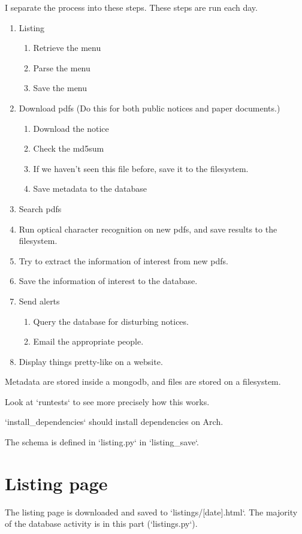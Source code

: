 I separate the process into these steps. These steps are run each day.

\begin{enumerate}
\item Listing
  \begin{enumerate}
  \item Retrieve the menu
  \item Parse the menu
  \item Save the menu
  \end{enumerate}
\item Download pdfs (Do this for both public notices and paper documents.)
  \begin{enumerate}
  \item Download the notice
  \item Check the md5sum
  \item If we haven't seen this file before, save it to the filesystem.
  \item Save metadata to the database
  \end{enumerate}
\item Search pdfs
  \item Run optical character recognition on new pdfs, and save results to the filesystem.
  \item Try to extract the information of interest from new pdfs.
  \item Save the information of interest to the database.
\item Send alerts
  \begin{enumerate}
  \item Query the database for disturbing notices.
  \item Email the appropriate people.
  \end{enumerate}
\item Display things pretty-like on a website.
\end{enumerate}

Metadata are stored inside a mongodb, and files are stored on a filesystem.

Look at `runtests` to see more precisely how this works.

`install_dependencies` should install dependencies on Arch.

The schema is defined in `listing.py` in `listing_save`.

\section{Listing page}
The listing page is downloaded and saved to `listings/[date].html`.
The majority of the database activity is in this part (`listings.py`).


